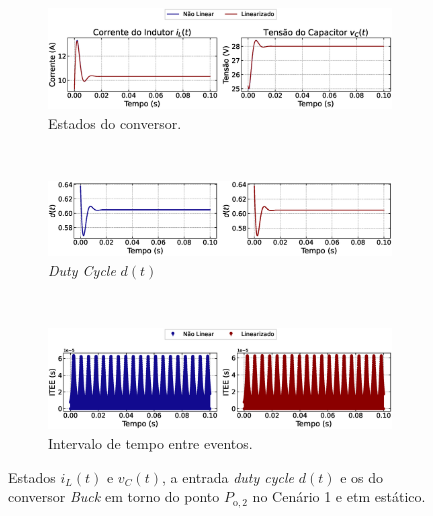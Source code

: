 \begin{figure}[H]
  \centering
  \captionsetup{justification=centering}
  \begin{subfigure}{1.\textwidth}
    \centering
    \includegraphics[width=1.\textwidth]{figuras/static-etm/buck/sim1/op2/result.eps}
    \caption{Estados do conversor.}
    \label{fig:buck_converter_constant_pcpl_static_etm_op2_duty_a}
  \end{subfigure}
  \\[6pt]
  \begin{subfigure}{1.\textwidth}
    \centering
    \includegraphics[width=1.\textwidth]{figuras/static-etm/buck/sim1/op2/duty-cycle.eps}
    \caption{\textit{Duty Cycle} $d(t)$}
    \label{fig:buck_converter_constant_pcpl_static_etm_op2_duty_b}
  \end{subfigure}
  \\[6pt]
  \begin{subfigure}{1.\textwidth}
    \centering
    \includegraphics[width=1.\textwidth]{figuras/static-etm/buck/sim1/op2/inter-event-times.eps}
    \caption{Intervalo de tempo entre eventos.}
    \label{fig:buck_converter_constant_pcpl_static_etm_op2_duty_c}
  \end{subfigure}
  \caption{Estados $i_L(t)$ e $v_C(t)$, a entrada \textit{duty cycle} $d(t)$ e os  do conversor \textit{Buck} em torno do ponto $P_{\mathrm{o}, 2}$ no Cenário 1 e \acrshort{etm} estático.}
\end{figure}

